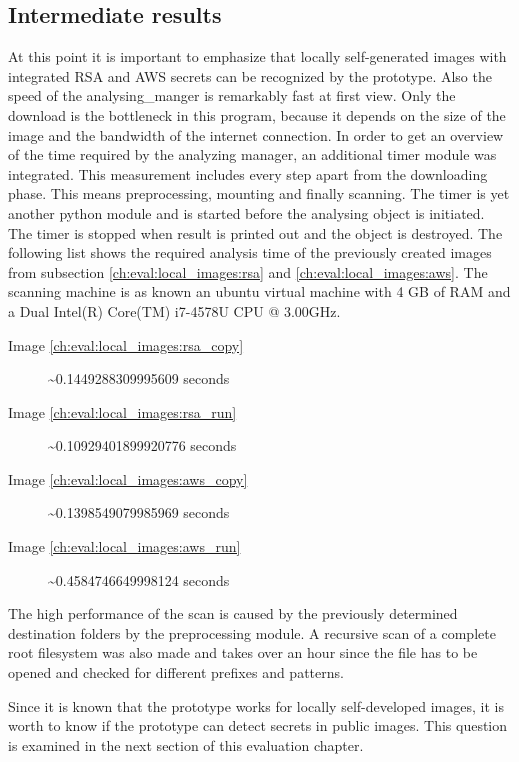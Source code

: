 \subsection{Intermediate results}
At this point it is important to emphasize that locally self-generated images with integrated RSA and AWS secrets can be recognized by the prototype. Also the speed of the analysing\_manger is remarkably fast at first view. 
Only the download is the bottleneck in this program, because it depends on the size of the image and the bandwidth of the internet connection. In order to get an overview of the time required by the analyzing manager, an additional timer module was integrated. This measurement includes every step apart from the downloading phase. This means preprocessing, mounting and finally scanning.
The timer is yet another python module and is started before the analysing object is initiated. The timer is stopped when result is printed out and the object is destroyed.
The following list shows the required analysis time of the previously created images from subsection \ref{ch:eval:local_images:rsa} and \ref{ch:eval:local_images:aws}. The scanning machine is as known an ubuntu virtual machine with 4 GB of RAM and a Dual Intel(R) Core(TM) i7-4578U CPU @ 3.00GHz.

\begin{description}
\item [Image \ref{ch:eval:local_images:rsa_copy}] \textasciitilde 0.1449288309995609 seconds
\item [Image \ref{ch:eval:local_images:rsa_run}] \textasciitilde 0.10929401899920776 seconds
\item [Image \ref{ch:eval:local_images:aws_copy}] \textasciitilde 0.1398549079985969 seconds
\item [Image \ref{ch:eval:local_images:aws_run}] \textasciitilde 0.4584746649998124 seconds
\end{description}
The high performance of the scan is caused by the previously determined destination folders by the preprocessing module. A recursive scan of a complete root filesystem was also made and takes over an hour since the file has to be opened and checked for different prefixes and patterns.

Since it is known that the prototype works for locally self-developed images, it is worth to know if the prototype can detect secrets in public images.
This question is examined in the next section of this evaluation chapter.